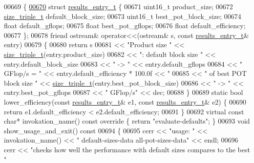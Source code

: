 \begin{DoxyCode}
{{{{{00669 \{
\hyperlink{structevaluate__defaults__action__t_1_1results__entry__t}{00670}   \textcolor{keyword}{struct }\hyperlink{structevaluate__defaults__action__t_1_1results__entry__t}{results\_entry\_t} \{
00671     uint16\_t product\_size;
00672     \hyperlink{structsize__triple__t}{size\_triple\_t} default\_block\_size;
00673     uint16\_t best\_pot\_block\_size;
00674     \textcolor{keywordtype}{float} default\_gflops;
00675     \textcolor{keywordtype}{float} best\_pot\_gflops;
00676     \textcolor{keywordtype}{float} default\_efficiency;
00677   \};
00678   \textcolor{keyword}{friend} ostream& operator<<(ostream& s, \textcolor{keyword}{const} \hyperlink{structevaluate__defaults__action__t_1_1results__entry__t}{results\_entry\_t}& entry)
00679   \{
00680     \textcolor{keywordflow}{return} s
00681       << \textcolor{stringliteral}{"Product size "} << \hyperlink{structsize__triple__t}{size\_triple\_t}(entry.product\_size)
00682       << \textcolor{stringliteral}{": default block size "} << entry.default\_block\_size
00683       << \textcolor{stringliteral}{" -> "} << entry.default\_gflops
00684       << \textcolor{stringliteral}{" GFlop/s = "} << entry.default\_efficiency * 100.0f << \textcolor{stringliteral}{" %
00685       << \textcolor{stringliteral}{" of best POT block size "} << \hyperlink{structsize__triple__t}{size\_triple\_t}(entry.best\_pot\_block\_size)
00686       << \textcolor{stringliteral}{" -> "} << entry.best\_pot\_gflops
00687       << \textcolor{stringliteral}{" GFlop/s"} << dec;
00688   \}
00689   \textcolor{keyword}{static} \textcolor{keywordtype}{bool} lower\_efficiency(\textcolor{keyword}{const} \hyperlink{structevaluate__defaults__action__t_1_1results__entry__t}{results\_entry\_t}& e1, \textcolor{keyword}{const} 
      \hyperlink{structevaluate__defaults__action__t_1_1results__entry__t}{results\_entry\_t}& e2) \{
00690     \textcolor{keywordflow}{return} e1.default\_efficiency < e2.default\_efficiency;
00691   \}
00692   \textcolor{keyword}{virtual} \textcolor{keyword}{const} \textcolor{keywordtype}{char}* invokation\_name()\textcolor{keyword}{ const override }\{ \textcolor{keywordflow}{return} \textcolor{stringliteral}{"evaluate-defaults"}; \}
00693   \textcolor{keywordtype}{void} show\_usage\_and\_exit()\textcolor{keyword}{ const}
00694 \textcolor{keyword}{  }\{
00695     cerr << \textcolor{stringliteral}{"usage: "} << invokation\_name() << \textcolor{stringliteral}{" default-sizes-data all-pot-sizes-data"} << endl;
00696     cerr << \textcolor{stringliteral}{"checks how well the performance with default sizes compares to the best "}
}}}}}}
\end{DoxyCode}
